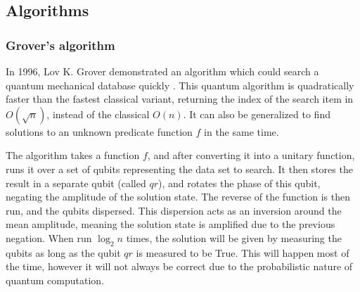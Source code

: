 \documentclass[a4paper,11pt, titlepage, twoside]{article}
\begin{document}
\subsection{Algorithms}
\subsubsection{Grover's algorithm}
In 1996, Lov K. Grover demonstrated an algorithm which could search a quantum mechanical database quickly \cite{grover}. This quantum algorithm is quadratically faster than the fastest classical variant, returning the index of the search item in $O(\sqrt{n})$, instead of the classical $O(n)$. It can also be generalized to find solutions to an unknown predicate function $f$ in the same time.\par
The algorithm takes a function $f$, and after converting it into a unitary function, runs it over a set of qubits representing the data set to search. It then stores the result in a separate qubit (called $qr$), and rotates the phase of this qubit, negating the amplitude of the solution state. The reverse of the function is then run, and the qubits dispersed. This dispersion acts as an inversion around the mean amplitude, meaning the solution state is amplified due to the previous negation. When run $\log_2 n$ times, the solution will be given by measuring the qubits as long as the qubit $qr$ is measured to be True. This will happen most of the time, however it will not always be correct due to the probabilistic nature of quantum computation.
\end{document}
